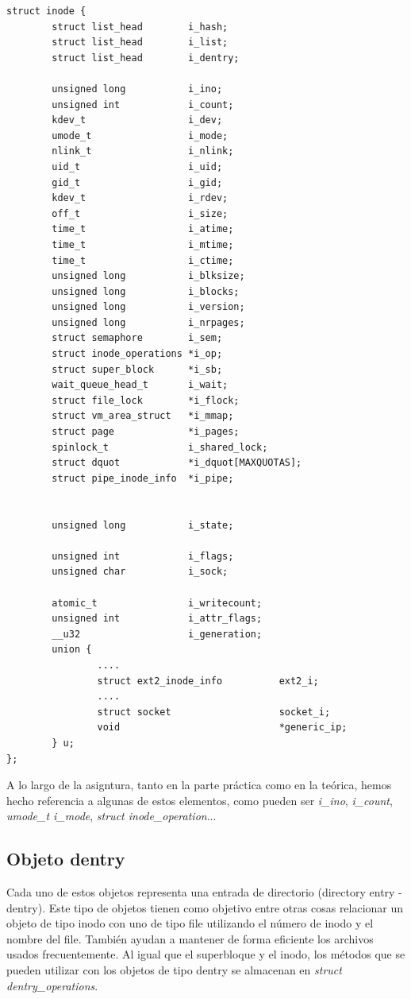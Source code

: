 \documentclass[11pt,a4paper]{article}
\newcommand\tab[1][1cm]{\hspace*{#1}}
\begin{document}
\begin{verbatim}
struct inode {
        struct list_head        i_hash;
        struct list_head        i_list;
        struct list_head        i_dentry;

        unsigned long           i_ino;
        unsigned int            i_count;
        kdev_t                  i_dev;
        umode_t                 i_mode;
        nlink_t                 i_nlink;
        uid_t                   i_uid;
        gid_t                   i_gid;
        kdev_t                  i_rdev;
        off_t                   i_size;
        time_t                  i_atime;
        time_t                  i_mtime;
        time_t                  i_ctime;
        unsigned long           i_blksize;
        unsigned long           i_blocks;
        unsigned long           i_version;
        unsigned long           i_nrpages;
        struct semaphore        i_sem;
        struct inode_operations *i_op;
        struct super_block      *i_sb;
        wait_queue_head_t       i_wait;
        struct file_lock        *i_flock;
        struct vm_area_struct   *i_mmap;
        struct page             *i_pages;
        spinlock_t              i_shared_lock;
        struct dquot            *i_dquot[MAXQUOTAS];
        struct pipe_inode_info  *i_pipe;

        
        unsigned long           i_state;

        unsigned int            i_flags;
        unsigned char           i_sock;

        atomic_t                i_writecount;
        unsigned int            i_attr_flags;
        __u32                   i_generation;
        union {
                ....
                struct ext2_inode_info          ext2_i;
                ....
                struct socket                   socket_i;
                void                            *generic_ip;
        } u;
};
\end{verbatim}

\tab A lo largo de la asigntura, tanto en la parte práctica como en la teórica, hemos hecho referencia a algunas de estos elementos, como pueden ser \emph{i\_ino}, \emph{i\_count}, \emph{umode\_t i\_mode}, \emph{struct inode\_operation}...

\subsection{Objeto dentry}

\tab Cada uno de estos objetos representa una entrada de directorio (directory entry - dentry). Este tipo de objetos tienen como objetivo entre otras cosas relacionar un objeto de tipo inodo con uno de tipo file utilizando el número de inodo y el nombre del file. También ayudan a mantener de forma eficiente los archivos usados frecuentemente. Al igual que el superbloque y el inodo, los métodos que se pueden utilizar con los objetos de tipo dentry se almacenan en \emph{struct dentry\_operations}.
\end{document}
